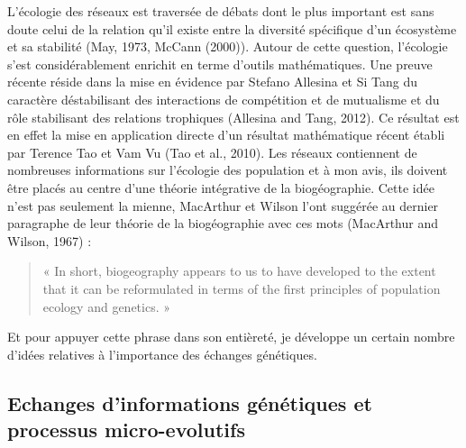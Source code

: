 L'écologie des réseaux est traversée de débats dont le plus important
est sans doute celui de la relation qu'il existe entre la diversité
spécifique d'un écosystème et sa stabilité (May, 1973, McCann (2000)).
Autour de cette question, l'écologie s'est considérablement enrichit en
terme d'outils mathématiques. Une preuve récente réside dans la mise en
évidence par Stefano Allesina et Si Tang du caractère déstabilisant des
interactions de compétition et de mutualisme et du rôle stabilisant des
relations trophiques (Allesina and Tang, 2012). Ce résultat est en effet
la mise en application directe d'un résultat mathématique récent établi
par Terence Tao et Vam Vu (Tao et al., 2010). Les réseaux contiennent de
nombreuses informations sur l'écologie des population et à mon avis, ils
doivent être placés au centre d'une théorie intégrative de la
biogéographie. Cette idée n'est pas seulement la mienne, MacArthur et
Wilson l'ont suggérée au dernier paragraphe de leur théorie de la
biogéographie avec ces mots (MacArthur and Wilson, 1967) :

\begin{quote}
« In short, biogeography appears to us to have developed to the extent
that it can be reformulated in terms of the first principles of
population ecology and genetics. »
\end{quote}

Et pour appuyer cette phrase dans son entièreté, je développe un certain
nombre d'idées relatives à l'importance des échanges génétiques.

\subsection*{Echanges d'informations génétiques et processus
micro-evolutifs}\label{echanges-dinformations-guxe9nuxe9tiques-et-processus-micro-evolutifs}

